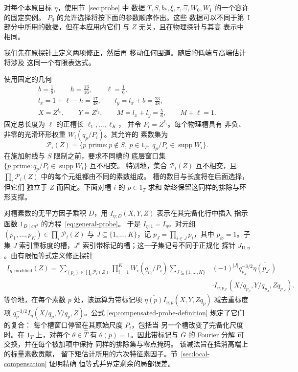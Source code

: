 \documentclass[11pt,a4paper]{article}
\numberwithin{equation}{section}
\numberwithin{figure}{section}
\theoremstyle{definition}
\theoremstyle{remark}
\begin{document}
对每个本原目标 $\eta$，使用节~\ref{sec:probe} 中
数据 $T,S,b_*,\xi,\tau,\Xi,W_0,W_1$ 的一个容许的固定实例。
$P_0$ 的允许选择将按下面的参数顺序作出。这些
数据可以不同于第~I 部分中所用的数据，但在本应用内它们
与 $Z$ 无关，且在物理探针与其高
表示中相同。

我们先在原探针上定义两项修正，然后再
移动任何围道。随后的低端与高端估计将涉及
这同一个有限表达式。

使用固定的几何
\begin{equation}
 \begin{gathered}
 b=\frac18,\qquad h=\frac{13}{16},\qquad \ell=\frac16,\\
 l_x=1+\ell-h=\frac{17}{48},\qquad
 l_y=l_x+b=\frac{23}{48},\\
 X=Z^{l_x},\qquad Y=Z^{l_y},\qquad
 M=l_x+l_y=\frac56,\qquad M+\ell=1.
 \end{gathered}
 \label{old-eq:5.1}
\end{equation}
固定总长度为 $\ell$ 的正槽长 $\ell_1,\ldots,\ell_K$，
并令 $P_i=Z^{\ell_i}$。每个物理槽具有
非负、非零的光滑环形权重 $W_i(q_p/P_i)$。其允许的
素数集为
\[
 \mathcal P_i(Z)=\{p\text{ prime}:p\notin S,\ p\in1_T,
                         \ q_p/P_i\in\operatorname{supp}W_i\}.
\]
在施加射线与 $S$ 限制之前，要求不同槽的
底层窗口集
$\{p\text{ prime}:q_p/P_i\in\operatorname{supp}W_i\}$
互不相交。
特别地，集合 $\mathcal P_i(Z)$ 互不相交，且
$\prod_i\mathcal P_i(Z)$ 中的每个元组都由不同的素数组成。
槽的数目与长度将在后面选择，但它们
独立于 $Z$ 而固定。下面对槽 $i$ 的 $p\in1_T$ 求和
始终保留这同样的排除与环形支撑。

对槽素数的无平方因子乘积 $D$，用
$I_{\eta;D}(X,Y,Z)$ 表示在其完备化行中插入
指示函数 $1_{D\mid cn^3}$ 的方程~\eqref{eq:general-probe}。
于是 $I_{\eta;1}=I_\eta$。对元组
$(p_1,\ldots,p_K)\in\prod_i\mathcal P_i(Z)$ 与
$J\subseteq\{1,\ldots,K\}$，记 $p_J=\prod_{i\in J}p_i$，其中
$p_\varnothing=1$。子集 $J$ 索引重标度的槽，$J^c$
索引带标记的槽；这一子集记号不同于正规化
探针 $J_{\mathrm{II},\eta}$。由有限恒等式定义修正探针
\begin{equation}\label{eq:compensated-probe-definition}
\begin{split}
 I_{\eta,\mathrm{modified}}(Z)
 =\sum_{(p_i)\in\prod_i\mathcal P_i(Z)}\prod_{i=1}^K W_i(q_{p_i}/P_i)
 \sum_{J\subseteq\{1,\ldots,K\}}&(-1)^{|J|}q_{p_J}^{-3/2}
          \overline{\eta(p_{J^c})}\\
 &\cdot I_{\eta;p_{J^c}}
       (X/q_{p_J},Y/q_{p_J},Zq_{p_{J^c}}).
\end{split}
\end{equation}
等价地，在每个素数 $p$ 处，该运算为带标记项
$\overline{\eta(p)}I_{\eta;p}(X,Y,Zq_p)$ 减去重标度项
$q_p^{-3/2}I_\eta(X/q_p,Y/q_p,Z)$。公式
\eqref{eq:compensated-probe-definition} 规定了它们的复合：
每个槽窗口停留在其原始尺度 $P_i$，包括当
另一个槽改变了完备化尺度时。在 $1_T$ 上，对每个
$\theta\in\widehat T$ 有 $\theta(p)=1$。因此带标记与 $\overline G$ 的 Fourier 分解
可交换，并在每个被加项中保持
同样的排除集与零点掩码。
该减法旨在抵消高端上的标量素数贡献，
留下矩估计所用的六次特征素因子。节~\ref{sec:local-compensation} 证明精确
恒等式并界定剩余的局部误差。
\end{document}
